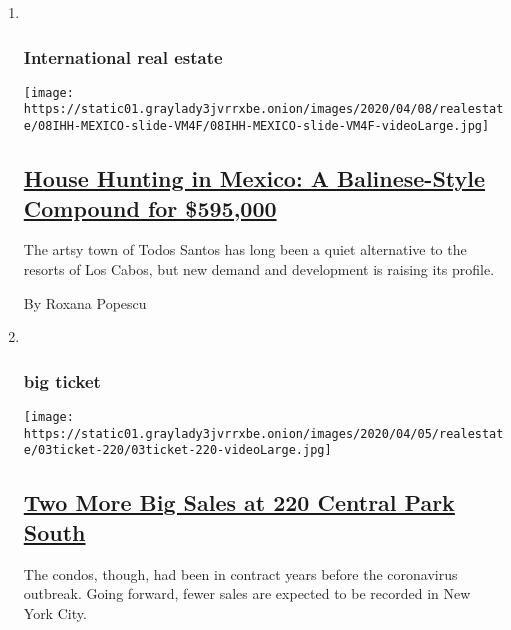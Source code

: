 \begin{enumerate}
\def\labelenumi{\arabic{enumi}.}
\item ~
  \hypertarget{international-real-estate-1}{%
  \subsubsection{International real
  estate}\label{international-real-estate-1}}

  \texttt{[image: https://static01.graylady3jvrrxbe.onion/images/2020/04/08/realestate/08IHH-MEXICO-slide-VM4F/08IHH-MEXICO-slide-VM4F-videoLarge.jpg]}

  \hypertarget{house-hunting-in-mexico-a-balinese-style-compound-for-595000-1}{%
  \subsection{\texorpdfstring{\href{/2020/04/08/realestate/house-hunting-in-mexico-a-balinese-style-compound-for-595000.html}{House
  Hunting in Mexico: A Balinese-Style Compound for
  \$595,000}}{House Hunting in Mexico: A Balinese-Style Compound for \$595,000}}\label{house-hunting-in-mexico-a-balinese-style-compound-for-595000-1}}

  The artsy town of Todos Santos has long been a quiet alternative to
  the resorts of Los Cabos, but new demand and development is raising
  its profile.

  By Roxana Popescu
\item ~
  \hypertarget{big-ticket}{%
  \subsubsection{big ticket}\label{big-ticket}}

  \texttt{[image: https://static01.graylady3jvrrxbe.onion/images/2020/04/05/realestate/03ticket-220/03ticket-220-videoLarge.jpg]}

  \hypertarget{two-more-big-sales-at-220-central-park-south}{%
  \subsection{\texorpdfstring{\href{/2020/04/03/realestate/two-more-big-sales-at-220-central-park-south.html}{Two
  More Big Sales at 220 Central Park
  South}}{Two More Big Sales at 220 Central Park South}}\label{two-more-big-sales-at-220-central-park-south}}

  The condos, though, had been in contract years before the coronavirus
  outbreak. Going forward, fewer sales are expected to be recorded in
  New York City.


\end{enumerate}
